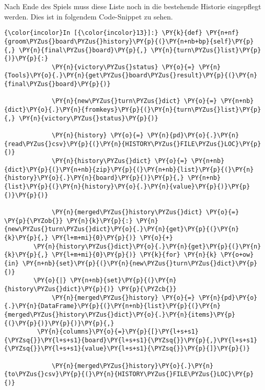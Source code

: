     Nach Ende des Spiels muss diese Liste noch in die bestehende Historie
eingepflegt werden. Dies ist in folgendem Code-Snippet zu sehen.

    \begin{Verbatim}[commandchars=\\\{\}]
{\color{incolor}In [{\color{incolor}13}]:} \PY{k}{def} \PY{n+nf}{groom\PYZus{}board\PYZus{}history}\PY{p}{(}\PY{n+nb+bp}{self}\PY{p}{,} \PY{n}{final\PYZus{}board}\PY{p}{,} \PY{n}{turn\PYZus{}list}\PY{p}{)}\PY{p}{:}
             \PY{n}{victory\PYZus{}status} \PY{o}{=} \PY{n}{Tools}\PY{o}{.}\PY{n}{get\PYZus{}board\PYZus{}result}\PY{p}{(}\PY{n}{final\PYZus{}board}\PY{p}{)}
         
             \PY{n}{new\PYZus{}turn\PYZus{}dict} \PY{o}{=} \PY{n+nb}{dict}\PY{o}{.}\PY{n}{fromkeys}\PY{p}{(}\PY{n}{turn\PYZus{}list}\PY{p}{,} \PY{n}{victory\PYZus{}status}\PY{p}{)}
         
             \PY{n}{history} \PY{o}{=} \PY{n}{pd}\PY{o}{.}\PY{n}{read\PYZus{}csv}\PY{p}{(}\PY{n}{HISTORY\PYZus{}FILE\PYZus{}LOC}\PY{p}{)}
             \PY{n}{history\PYZus{}dict} \PY{o}{=} \PY{n+nb}{dict}\PY{p}{(}\PY{n+nb}{zip}\PY{p}{(}\PY{n+nb}{list}\PY{p}{(}\PY{n}{history}\PY{o}{.}\PY{n}{board}\PY{p}{)}\PY{p}{,} \PY{n+nb}{list}\PY{p}{(}\PY{n}{history}\PY{o}{.}\PY{n}{value}\PY{p}{)}\PY{p}{)}\PY{p}{)}
         
             \PY{n}{merged\PYZus{}history\PYZus{}dict} \PY{o}{=} \PY{p}{\PYZob{}} \PY{n}{k}\PY{p}{:} \PY{n}{new\PYZus{}turn\PYZus{}dict}\PY{o}{.}\PY{n}{get}\PY{p}{(}\PY{n}{k}\PY{p}{,} \PY{l+m+mi}{0}\PY{p}{)} \PY{o}{+} 
		\PY{n}{history\PYZus{}dict}\PY{o}{.}\PY{n}{get}\PY{p}{(}\PY{n}{k}\PY{p}{,} \PY{l+m+mi}{0}\PY{p}{)} \PY{k}{for} \PY{n}{k} \PY{o+ow}{in} \PY{n+nb}{set}\PY{p}{(}\PY{n}{new\PYZus{}turn\PYZus{}dict}\PY{p}{)} 
		\PY{o}{|} \PY{n+nb}{set}\PY{p}{(}\PY{n}{history\PYZus{}dict}\PY{p}{)} \PY{p}{\PYZcb{}}
             \PY{n}{merged\PYZus{}history} \PY{o}{=} \PY{n}{pd}\PY{o}{.}\PY{n}{DataFrame}\PY{p}{(}\PY{n+nb}{list}\PY{p}{(}\PY{n}{merged\PYZus{}history\PYZus{}dict}\PY{o}{.}\PY{n}{items}\PY{p}{(}\PY{p}{)}\PY{p}{)}\PY{p}{,}
		 \PY{n}{columns}\PY{o}{=}\PY{p}{[}\PY{l+s+s1}{\PYZsq{}}\PY{l+s+s1}{board}\PY{l+s+s1}{\PYZsq{}}\PY{p}{,}\PY{l+s+s1}{\PYZsq{}}\PY{l+s+s1}{value}\PY{l+s+s1}{\PYZsq{}}\PY{p}{]}\PY{p}{)}
         
             \PY{n}{merged\PYZus{}history}\PY{o}{.}\PY{n}{to\PYZus{}csv}\PY{p}{(}\PY{n}{HISTORY\PYZus{}FILE\PYZus{}LOC}\PY{p}{)}
\end{Verbatim}

